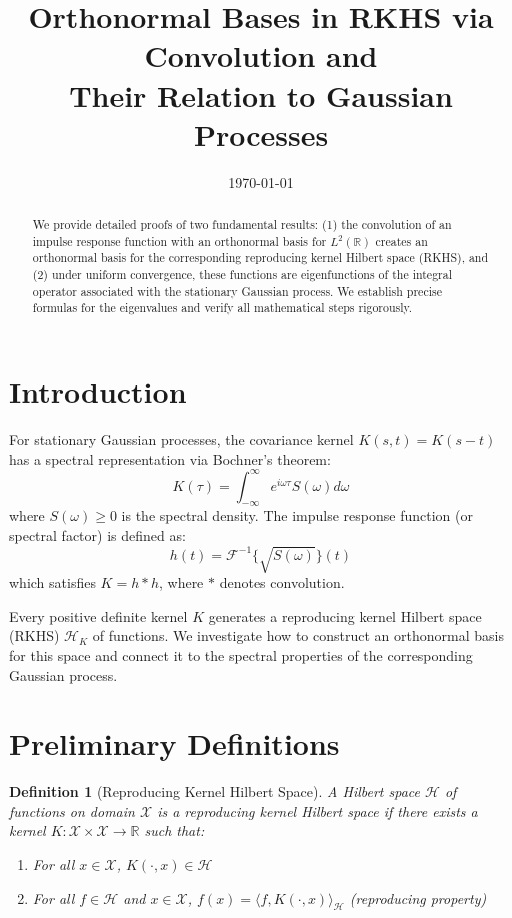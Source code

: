 \documentclass{article}
\title{Orthonormal Bases in RKHS via Convolution and\\Their Relation to Gaussian Processes}
\author{}
\date{\today}
\newtheorem{definition}{Definition}
\begin{document}
\maketitle

\begin{abstract}
We provide detailed proofs of two fundamental results: (1) the convolution of an impulse response function with an orthonormal basis for $L^2(\mathbb{R})$ creates an orthonormal basis for the corresponding reproducing kernel Hilbert space (RKHS), and (2) under uniform convergence, these functions are eigenfunctions of the integral operator associated with the stationary Gaussian process. We establish precise formulas for the eigenvalues and verify all mathematical steps rigorously.
\end{abstract}

\section{Introduction}

For stationary Gaussian processes, the covariance kernel $K(s,t) = K(s-t)$ has a spectral representation via Bochner's theorem:
\begin{equation}
K(\tau) = \int_{-\infty}^{\infty} e^{i\omega\tau} S(\omega) d\omega
\end{equation}
where $S(\omega) \geq 0$ is the spectral density. The impulse response function (or spectral factor) is defined as:
\begin{equation}
h(t) = \mathcal{F}^{-1}\{\sqrt{S(\omega)}\}(t)
\end{equation}
which satisfies $K = h * h$, where $*$ denotes convolution.

Every positive definite kernel $K$ generates a reproducing kernel Hilbert space (RKHS) $\mathcal{H}_K$ of functions. We investigate how to construct an orthonormal basis for this space and connect it to the spectral properties of the corresponding Gaussian process.

\section{Preliminary Definitions}

\begin{definition}[Reproducing Kernel Hilbert Space]
A Hilbert space $\mathcal{H}$ of functions on domain $\mathcal{X}$ is a reproducing kernel Hilbert space if there exists a kernel $K: \mathcal{X} \times \mathcal{X} \rightarrow \mathbb{R}$ such that:
\begin{enumerate}
\item For all $x \in \mathcal{X}$, $K(\cdot, x) \in \mathcal{H}$
\item For all $f \in \mathcal{H}$ and $x \in \mathcal{X}$, $f(x) = \langle f, K(\cdot, x) \rangle_{\mathcal{H}}$ (reproducing property)
\end{enumerate}
\end{definition}
\end{document}
